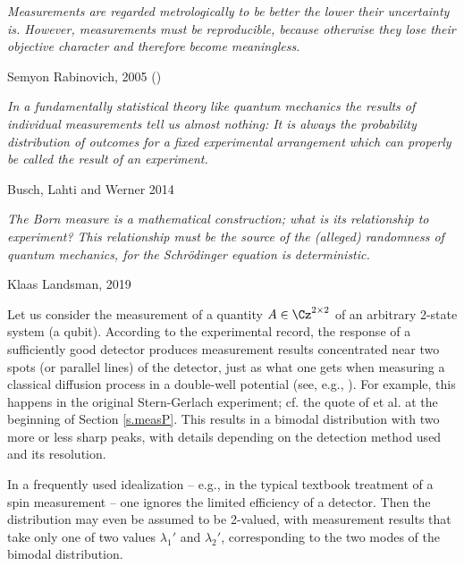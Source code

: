 \documentclass[12pt]{article}
\begin{document}
\bigskip


\nopagebreak
\hfill\parbox[t]{10.8cm}{\footnotesize

{\em Measurements are regarded metrologically to be better the lower
their uncertainty is. However, measurements must be reproducible,
because otherwise they lose their objective character and therefore
become meaningless.}

\hfill Semyon Rabinovich, 2005 (\cite[p.22]{Rab})
}

\bigskip


\nopagebreak
\hfill\parbox[t]{10.8cm}{\footnotesize

{\em In a fundamentally statistical theory like quantum mechanics the
results of individual measurements tell us almost nothing: It is always
the probability distribution of outcomes for a fixed experimental
arrangement which can properly be called the result of an experiment.}

\hfill Busch, Lahti and Werner 2014 \cite[p.5]{BusLW}
}

\bigskip


\nopagebreak
\hfill\parbox[t]{10.8cm}{\footnotesize

{\em The Born measure is a mathematical construction; what is its 
relationship to experiment? This relationship must be the source of the 
(alleged) randomness of quantum mechanics, for the Schr\"odinger 
equation is deterministic.}

\hfill Klaas Landsman, 2019 \cite[p.20]{Lan2019} 
}

\bigskip


Let us consider the measurement of a quantity $A\in\Cz^{2\times 2}$ of
an arbitrary 2-state system (a qubit).
According to the experimental record, the response of a sufficiently
good detector produces measurement results concentrated near two spots
(or parallel lines) of the detector, just as what
one gets when measuring a classical diffusion process in a double-well
potential (see, e.g.,  \cite{HonZ}).
For example, this happens in the original Stern-Gerlach experiment; cf.
the quote of  et al. \cite{BusGL} at the beginning of
Section \ref{s.measP}. This results in a bimodal distribution
with two more or less sharp peaks, with details depending on the
detection method used and its resolution.

In a frequently used idealization -- e.g., in the typical textbook
treatment of a spin measurement -- one ignores the limited efficiency
of a detector. Then the distribution may even be assumed to be 2-valued,
with measurement results that take only one of two values $\lambda_{1}'$
and $\lambda_{2}'$, corresponding to the two modes of the bimodal
distribution.
\end{document}
